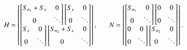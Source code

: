 \documentclass[onecolumn,authoryear]{els-mrw}
\begin{document}
\begin{align}\label{eq:correlation-covariance-matrices}
    \covgw = \begin{bmatrix*}[c]
        \begin{bmatrix*}[c]
            S_{n_1} + S_s & 0 \\
            0 & \ddots \\
        \end{bmatrix*}
        \begin{bmatrix*}[c]
            S_s & 0 \\
            0 & \ddots \\
        \end{bmatrix*} \\
        \begin{bmatrix*}[c]
            S_s & 0 \\
            0 & \ddots \\
        \end{bmatrix*}
        \begin{bmatrix*}[c]
            S_{n_2} + S_s & 0 \\
            0 & \ddots \\
        \end{bmatrix*} \\
    \end{bmatrix*}, \msp \msp
    \covnoise = \begin{bmatrix*}[c]
        \begin{bmatrix*}[c]
            S_{n_1} & 0 \\
            0 & \ddots \\
        \end{bmatrix*}
        \begin{bmatrix*}[c]
            0 & 0 \\
            0 & \ddots \\
        \end{bmatrix*} \\
        \begin{bmatrix*}[c]
            0 & 0 \\
            0 & \ddots \\
        \end{bmatrix*}
        \begin{bmatrix*}[c]
            S_{n_2} & 0 \\
            0 & \ddots \\
        \end{bmatrix*} \\
    \end{bmatrix*}.
\end{align}
\end{document}

